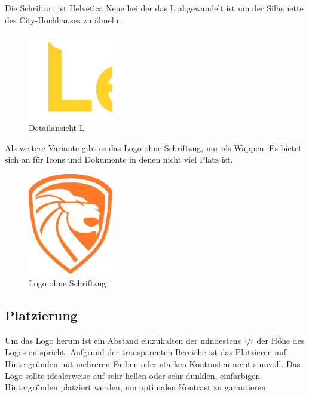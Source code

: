 \documentclass{article}
\begin{document}
Die Schriftart ist Helvetica Neue bei der das L abgewandelt ist um der Silhouette des City-Hochhauses zu ähneln.

\begin{figure}[H]
\centering
\includegraphics[width=0.33\textwidth]{Docs/logo_detail_L.png}
\caption{Detailansicht L}
\end{figure}


Als weitere Variante gibt es das Logo ohne Schriftzug, nur als Wappen. Es bietet sich an für Icons und Dokumente in denen nicht viel Platz ist.

\begin{figure}[H]
\centering
\includegraphics[width=0.33\textwidth]{Docs/Emblem.eps}
\caption{Logo ohne Schriftzug}
\end{figure}

\subsection{Platzierung}

Um das Logo herum ist ein Abstand einzuhalten der mindestens $\sfrac{1}{7}$ der Höhe des Logos entspricht. Aufgrund der transparenten Bereiche ist das Platzieren auf Hintergründen mit mehreren Farben oder starken Kontrasten nicht sinnvoll. Das Logo sollte idealerweise auf sehr hellen oder sehr dunklen, einfarbigen Hintergründen platziert werden, um optimalen Kontrast zu garantieren.
\end{document}
